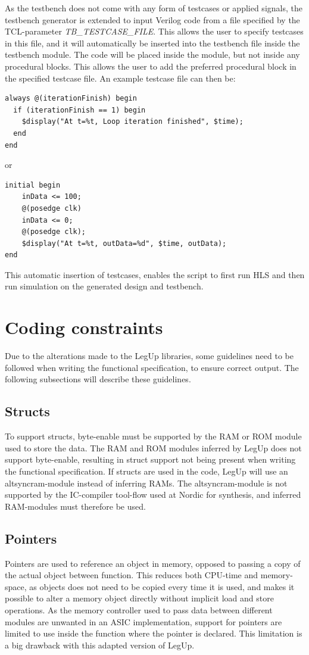 As the testbench does not come with any form of testcases or applied signals, the testbench generator is extended to input Verilog code from a file specified by the TCL-parameter \textit{TB\_TESTCASE\_FILE}. This allows the user to specify testcases in this file, and it will automatically be inserted into the testbench file inside the testbench module. The code will be placed inside the module, but not inside any procedural blocks. This allows the user to add the preferred procedural block in the specified testcase file. An example testcase file can then be:

\lstset{language=Verilog, style=Verilogstyle}
\begin{lstlisting}
always @(iterationFinish) begin
  if (iterationFinish == 1) begin
    $display("At t=%t, Loop iteration finished", $time);
  end
end
\end{lstlisting}
or
\begin{lstlisting}
initial begin
    inData <= 100;
    @(posedge clk)
    inData <= 0;
    @(posedge clk);
    $display("At t=%t, outData=%d", $time, outData);
end
\end{lstlisting}
This automatic insertion of testcases, enables the script to first run HLS and then run simulation on the generated design and testbench.

\section{Coding constraints}
Due to the alterations made to the LegUp libraries, some guidelines need to be followed when writing the functional specification, to ensure correct output. The following subsections will describe these guidelines.
\subsection{Structs}
To support structs, byte-enable must be supported by the RAM or ROM module used to store the data. The RAM and ROM modules inferred by LegUp does not support byte-enable, resulting in struct support not being present when writing the functional specification. If structs are used in the code, LegUp will use an altsyncram-module instead of inferring RAMs. The altsyncram-module is not supported by the IC-compiler tool-flow used at Nordic for synthesis, and inferred RAM-modules must therefore be used. 
\subsection{Pointers}
Pointers are used to reference an object in memory, opposed to passing a copy of the actual object between function. This reduces both CPU-time and memory-space, as objects does not need to be copied every time it is used, and makes it possible to alter a memory object directly without implicit load and store operations. As the memory controller used to pass data between different modules are unwanted in an ASIC implementation, support for pointers are limited to use inside the function where the pointer is declared. This limitation is a big drawback with this adapted version of LegUp.
